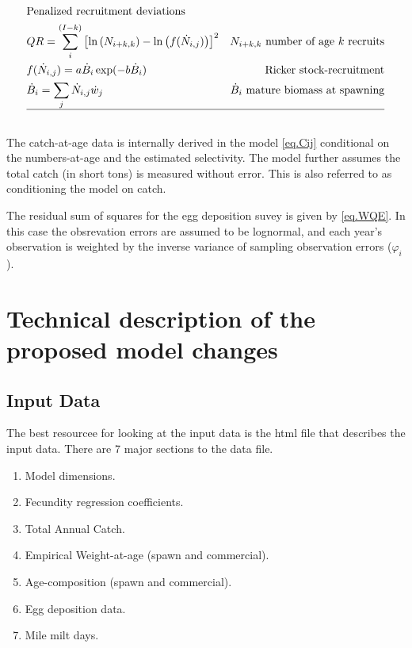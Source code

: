 \documentclass[12pt,letterpaper]{article}
\newcounter{saveEq}
\def\getEq{\setcounter{equation}{\value{saveEq}}}
\def\normalEq{ %
    \getEq
    \renewcommand{\theequation}{\arabic{section}.\arabic{equation}}}
\begin{document}
\begin{table}[ht]
\begin{align}
        &\mbox{Penalized recruitment deviations} \nonumber \\
        & QR = \sum_{i}^{(I-k)} \left[  \ln\left(N_{i+k,k}\right) 
        - \ln\left(f(\dot{N}_{i,j}) \right) \right]^2 
          & \mbox{$N_{i+k,k}$ number of age $k$ recruits}\\
        & f(\dot{N}_{i,j}) = a \dot{B}_i \exp(-b \dot{B}_i) &\mbox{Ricker stock-recruitment}\\
        & \dot{B}_i = \sum_j \dot{N}_{i,j} \dot{w}_j &\mbox{$\dot{B}_i$ mature biomass at spawning} \\
        \hline \nonumber
      \end{align}
      \normalEq
    \end{table}
    The catch-at-age data is internally derived in the model \eqref{eq.Cij} conditional on the numbers-at-age and the estimated selectivity. The model further assumes the total catch (in short tons) is measured without error.  This is also referred to as conditioning the model on catch.

    The residual sum of squares for the egg deposition suvey is given by \eqref{eq.WQE}.  In this case the obsrevation errors are assumed to be lognormal, and each year's observation is weighted by the inverse variance of sampling observation errors ($\varphi_i$).




  \clearpage
  \section{Technical description of the proposed model changes} %
  \label{sec:methods}
  
  \subsection{Input Data} %
  \label{sub:input_data}
    The best resourcee for looking at the input data is the html file that describes the input data. There are 7 major sections to the data file.
    \begin{enumerate}
      \item Model dimensions.
      \item Fecundity regression coefficients.
      \item Total Annual Catch.
      \item Empirical Weight-at-age (spawn and commercial).
      \item Age-composition (spawn and commercial).
      \item Egg deposition data.
      \item Mile milt days.
    \end{enumerate}
\end{document}
